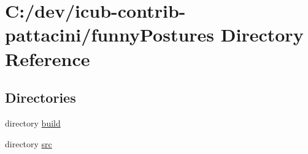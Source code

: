 \section{C\+:/dev/icub-\/contrib-\/pattacini/funny\+Postures Directory Reference}
\label{dir_4618040849a893aa2abf9a5cd90482df}
\subsection*{Directories}
\begin{DoxyCompactItemize}
\item 
directory \hyperlink{dir_58dad6826832034288aa5ff5045d2260}{build}
\item 
directory \hyperlink{dir_3fc0bfd5dd5d4b135f0761eacfe8c49b}{src}
\end{DoxyCompactItemize}
